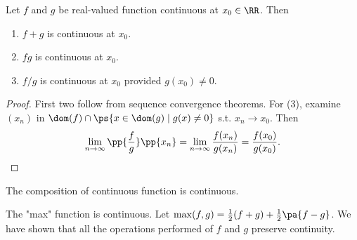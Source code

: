 \documentclass[11pt]{scrartcl}
\numberwithin{equation}{section}
\begin{document}
\begin{proposition}
    Let $f$ and $g$ be real-valued function continuous at $x_0\in\RR$.
    Then 
    \begin{enumerate}
        \item $f+g$ is continuous at $x_0$.
        \item $fg$ is continuous at $x_0$.
        \item $f/g$ is continuous at $x_0$ provided $g(x_0)\neq 0$.
    \end{enumerate}
\end{proposition}
\begin{proof}
    First two follow from sequence convergence theorems.
    For (3), examine $(x_n)$ in $\dom(f)\cap \ps{x\in\dom(g)\mid g(x)\neq 0}$ s.t. $x_n\to x_0$. Then 
    \[ \lim_{n\rightarrow \infty}\pp{\frac{f}{g}}\pp{x_n} = \lim_{n\rightarrow \infty}\frac{f(x_n)}{g(x_n)}=\frac{f(x_0)}{g(x_0)}.
    \qedhere \]
\end{proof}
\begin{proposition}
    The composition of continuous function is continuous.
\end{proposition}

\begin{example}
    The "max" function is continuous. Let $\max(f,g) = \frac{1}{2}(f+g) + \frac{1}{2}\pa{f-g}$. We have shown that all the operations
    performed of $f$ and $g$ preserve continuity.
\end{example}
\end{document}
